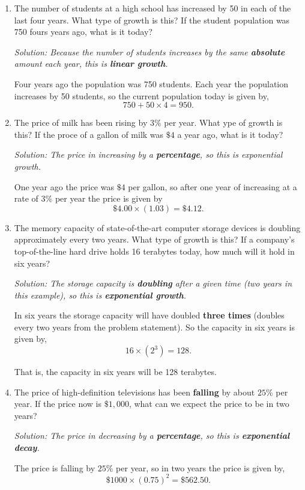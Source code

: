 \documentclass[12pt]{article}
\begin{document}
\begin{enumerate}
\item The number of students at a high school has increased by 50 in each of the last four years.  What type of growth is this?  If the student population was 750 fours years ago, what is it today?

{\it Solution:
Because the number of students increases by the same {\bf absolute} amount each year, this is {\bf linear growth}.

\vskip 5pt

Four years ago the population was 750 students.  Each year the population increases by 50 students, so the current population today is given by, $$750 + 50 \times 4 = 950.$$

}

\item The price of milk has been rising by $3\%$ per year.  What ype of growth is this?  If the proce of a gallon of milk was $\$4$ a year ago, what is it today?

{\it Solution:
The price in increasing by a {\bf percentage}, so this is exponential growth.

\vskip 5pt

One year ago the price was $\$4$ per gallon, so after one year of increasing at a rate of $3\%$ per year the price is given by $$ \$4.00 \times (1.03) = \$4.12.$$

}

\item The memory capacity of state-of-the-art computer storage devices is doubling approximately every two years.  What type of growth is this?  If a company's top-of-the-line hard drive holds 16 terabytes today, how much will it hold in six years?

{\it Solution:
The storage capacity is {\bf doubling} after a given time (two years in this example), so this is {\bf exponential growth}.

\vskip 5pt

In six years the storage capacity will have doubled {\bf three times} (doubles every two years from the problem statement).  So the capacity in six years is given by, $$16 \times (2^3) = 128.$$

That is, the capacity in six years will be 128 terabytes.

}
\item The price of high-definition televisions has been {\bf falling} by about $25\%$ per year.  If the price now is $\$1,000$, what can we expect the price to be in two years?

{\it Solution:
The price in decreasing by a {\bf percentage}, so this is {\bf exponential decay}.

\vskip 5pt

The price is falling by $25\%$ per year, so in two years the price is given by, $$\$1000 \times (0.75)^2 = \$562.50.$$

}




\end{enumerate}
\end{document}
